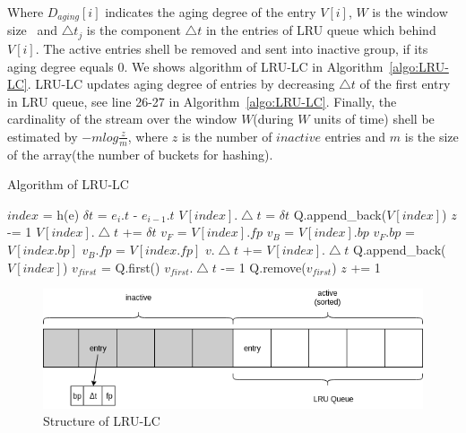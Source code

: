Where $D_{aging}[i]$ indicates the aging degree of the entry $V[i]$, $W$ is the
window size~\cite{shan2016lru} and $\bigtriangleup t_j$ is the component
$\bigtriangleup t$ in the entries of LRU queue which behind $V[i]$. The active entries shell
be removed and sent into inactive group, if its aging degree equals 0. We shows
algorithm of LRU-LC in Algorithm~\ref{algo:LRU-LC}. LRU-LC updates aging degree
of entries by decreasing $\bigtriangleup t$ of the first entry in LRU queue, see
line 26-27 in Algorithm~\ref{algo:LRU-LC}. Finally, the cardinality of the
stream over the window $W$(during $W$ units of time) shell be estimated by $
-mlog\frac{z}{m}$, where $z$ is the number of $inactive$ entries and $m$ is the
size of the array(the number of buckets for hashing).


\begin{algorithm}
\caption{Algorithm of LRU-LC}
\label{algo:LRU-LC}
\begin{algorithmic}[1]
\Input
\EndInput
\Output
\EndOutput

\State $index$ = h(e) 
\State $\delta t$ = $e_i.t$ - $e_{i-1}.t$
    \State $V[index].\bigtriangleup t$ = $\delta t$
    \State Q.append\_back($V[index]$)
    \State $z$ -= 1
\Else {}
     
        \State $V[index].\bigtriangleup t$ += $\delta t$
    \Else
        \State $v_F$ = $V[index].fp$
        \State $v_B$ = $V[index].bp$
        \State $v_F.bp$ = $V[index.bp]$
        \State $v_B.fp$ = $V[index.fp]$
        \State $v.\bigtriangleup t$ += $V[index].\bigtriangleup t$
        \State Q.append\_back($V[index]$)
    \EndIf
\EndIf
\State $v_{first}$ = Q.first() 
\State $v_{first}.\bigtriangleup t$ -= 1
    \State Q.remove($v_{first}$)
    \State $z$ += 1
\EndIf
\end{algorithmic}
\end{algorithm}

\begin{figure}
    \centering
    \includegraphics[width=0.8\columnwidth]{figures/LRU-LC.png}
    \caption{Structure of LRU-LC}
    \label{fig:LRU-LC}
\end{figure}

